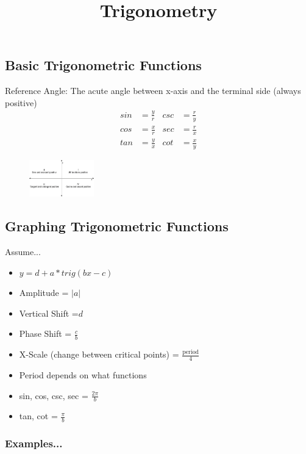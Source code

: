 \documentclass[twocolumn]{article}
\title{\vspace{-5ex}Trigonometry \vspace{-5ex}}
\author{}
\date{}
\begin{document}
	\maketitle{}
	
	\subsection*{Basic Trigonometric Functions}
	Reference Angle: The acute angle between x-axis and the terminal side (always positive)
	\begin{align*}
		sin &= \frac{y}{r}  & csc &= \frac{r}{y} \\
		cos &= \frac{x}{r} & sec &= \frac{r}{x} \\
		tan &= \frac{y}{x} & cot &= \frac{x}{y}
	\end{align*}

	\begin{figure}[h]
		\centering
		\includegraphics[width=0.25\textwidth]{positive_quadrants.jpg}
	\end{figure}

	\subsection*{Graphing Trigonometric Functions}

	Assume...
	\begin{itemize}[label=--]
		\setlength\itemsep{-0.55em}
		\item $ y = d + a * trig(bx - c) $
		\item Amplitude = $ \vert a \vert $
		\item Vertical Shift =$ d $
		\item Phase Shift = $ \frac{c}{b} $
		\item X-Scale (change between critical points) = $ \frac{\text{period}}{4} $
		\item Period depends on what functions
		\item sin, cos, csc, sec = $ \frac{2\pi}{b} $
		\item tan, cot = $ \frac{\pi}{b} $
	\end{itemize}
	
	\subsubsection*{Examples...}
\end{document}
